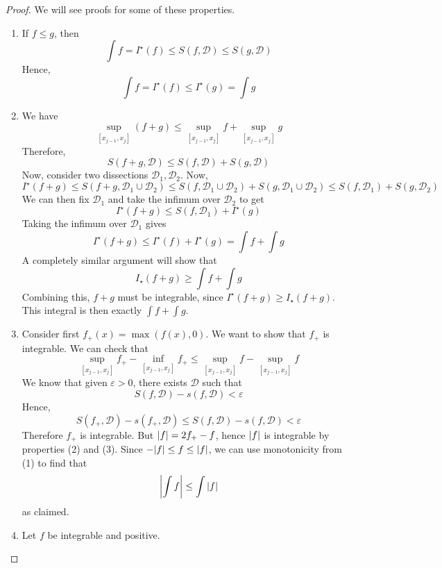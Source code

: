 \begin{proof}
	We will see proofs for some of these properties.
	\begin{enumerate}[(1)]
		\item If \(f \leq g\), then
		      \[
			      \int f = I^\star(f) \leq S(f, \mathcal D) \leq S(g, \mathcal D)
		      \]
		      Hence,
		      \[
			      \int f = I^\star(f) \leq I^\star(g) = \int g
		      \]
		\item We have
		      \[
			      \sup_{[x_{j-1}, x_j]} (f + g) \leq \sup_{[x_{j-1}, x_j]} f + \sup_{[x_{j-1}, x_j]} g
		      \]
		      Therefore,
		      \[
			      S(f + g, \mathcal D) \leq S(f, \mathcal D) + S(g, \mathcal D)
		      \]
		      Now, consider two dissections \(\mathcal D_1, \mathcal D_2\).
		      Now,
		      \[
			      I^\star(f + g) \leq S(f + g, \mathcal D_1 \cup \mathcal D_2) \leq S(f, \mathcal D_1 \cup \mathcal D_2) + S(g, \mathcal D_1 \cup \mathcal D_2) \leq S(f, \mathcal D_1) + S(g, \mathcal D_2)
		      \]
		      We can then fix \(\mathcal D_1\) and take the infimum over \(\mathcal D_2\) to get
		      \[
			      I^\star(f + g) \leq S(f, \mathcal D_1) + I^\star(g)
		      \]
		      Taking the infimum over \(\mathcal D_1\) gives
		      \[
			      I^\star(f + g) \leq I^\star(f) + I^\star(g) = \int f + \int g
		      \]
		      A completely similar argument will show that
		      \[
			      I_\star(f + g) \geq \int f + \int g
		      \]
		      Combining this, \(f+g\) must be integrable, since \(I^\star(f + g) \geq I_\star(f + g)\).
		      This integral is then exactly \(\int f + \int g\).
		      \setcounter{enumi}{3}
		\item Consider first \(f_+(x) = \max(f(x), 0)\).
		      We want to show that \(f_+\) is integrable.
		      We can check that
		      \[
			      \sup_{[x_{j-1}, x_j]}f_+ - \inf_{[x_{j-1}, x_j]}f_+ \leq \sup_{[x_{j-1}, x_j]}f - \sup_{[x_{j-1}, x_j]}f
		      \]
		      We know that given \(\varepsilon > 0\), there exists \(\mathcal D\) such that
		      \[
			      S(f, \mathcal D) - s(f, \mathcal D) < \varepsilon
		      \]
		      Hence,
		      \[
			      S(f_+, \mathcal D) - s(f_+, \mathcal D) \leq S(f, \mathcal D) - s(f, \mathcal D) < \varepsilon
		      \]
		      Therefore \(f_+\) is integrable.
		      But \(\abs{f} = 2f_+ - f\), hence \(\abs{f}\) is integrable by properties (2) and (3).
		      Since \(-\abs{f} \leq f \leq \abs{f}\), we can use monotonicity from (1) to find that
		      \[
			      \abs{\int f} \leq \int \abs{f}
		      \]
		      as claimed.
		\item Let \(f\) be integrable and positive.

\end{enumerate}
\end{proof}
